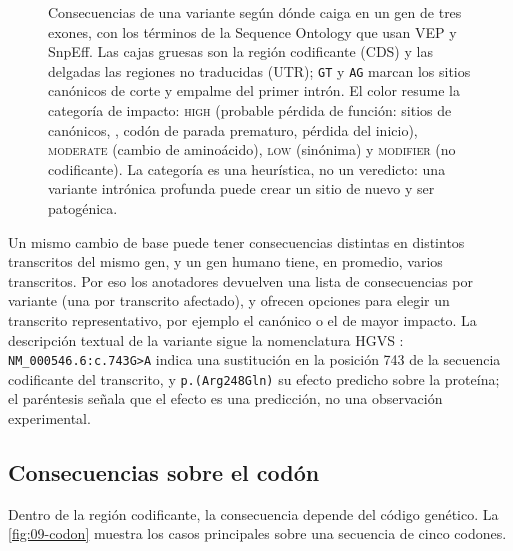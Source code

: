 \begin{figure}[t]
\caption[Consecuencias según la posición en el gen]{Consecuencias de una variante según dónde caiga en un gen de tres exones, con los términos de la Sequence Ontology que usan VEP y SnpEff. Las cajas gruesas son la región codificante (CDS) y las delgadas las regiones no traducidas (UTR); \texttt{GT} y \texttt{AG} marcan los sitios canónicos de corte y empalme del primer intrón. El color resume la categoría de impacto: \textsc{high} (probable pérdida de función: sitios de  canónicos, , codón de parada prematuro, pérdida del inicio), \textsc{moderate} (cambio de aminoácido), \textsc{low} (sinónima) y \textsc{modifier} (no codificante). La categoría es una heurística, no un veredicto: una variante intrónica profunda puede crear un sitio de  nuevo y ser patogénica.}
\label{fig:09-gen}
\end{figure}

Un mismo cambio de base puede tener consecuencias distintas en distintos transcritos del mismo gen, y un gen humano tiene, en promedio, varios transcritos. Por eso los anotadores devuelven una lista de consecuencias por variante (una por transcrito afectado), y ofrecen opciones para elegir un transcrito representativo, por ejemplo el canónico o el de mayor impacto. La descripción textual de la variante sigue la nomenclatura HGVS \parencite{c09-dendunnen2016}: \texttt{NM\_000546.6:c.743G>A} indica una sustitución en la posición 743 de la secuencia codificante del transcrito, y \texttt{p.(Arg248Gln)} su efecto predicho sobre la proteína; el paréntesis señala que el efecto es una predicción, no una observación experimental.

\subsection{Consecuencias sobre el codón}

Dentro de la región codificante, la consecuencia depende del código genético. La \cref{fig:09-codon} muestra los casos principales sobre una secuencia de cinco codones.

